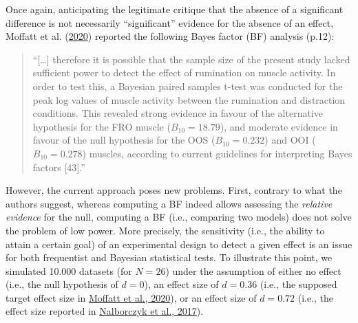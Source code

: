 \documentclass[
  man, donotrepeattitle,floatsintext]{apa6}
\begin{document}
Once again, anticipating the legitimate critique that the absence of a significant difference is not necessarily ``significant'' evidence for the absence of an effect, Moffatt et al. (\protect\hyperlink{ref-moffatt_inner_2020}{2020}) reported the following Bayes factor (BF) analysis (p.12):

\begin{quote}
``{[}\ldots{]} therefore it is possible that the sample size of the present study lacked sufficient power to detect the effect of rumination on muscle activity. In order to test this, a Bayesian paired samples t-test was conducted for the peak log values of muscle activity between the rumination and distraction conditions. This revealed strong evidence in favour of the alternative hypothesis for the FRO muscle (\(B_{10} = 18.79\)), and moderate evidence in favour of the null hypothesis for the OOS (\(B_{10} = 0.232\)) and OOI (\(B_{10} = 0.278\)) muscles, according to current guidelines for interpreting Bayes factors {[}43{]}.''
\end{quote}

However, the current approach poses new problems. First, contrary to what the authors suggest, whereas computing a BF indeed allows assessing the \emph{relative evidence} for the null, computing a BF (i.e., comparing two models) does not solve the problem of low power. More precisely, the sensitivity (i.e., the ability to attain a certain goal) of an experimental design to detect a given effect is an issue for both frequentist and Bayesian statistical tests. To illustrate this point, we simulated 10.000 datasets (for \(N = 26\)) under the assumption of either no effect (i.e., the null hypothesis of \(d = 0\)), an effect size of \(d = 0.36\) (i.e., the supposed target effect size in \protect\hyperlink{ref-moffatt_inner_2020}{Moffatt et al., 2020}), or an effect size of \(d = 0.72\) (i.e., the effect size reported in \protect\hyperlink{ref-nalborczyk_orofacial_2017}{Nalborczyk et al., 2017}).
\end{document}
